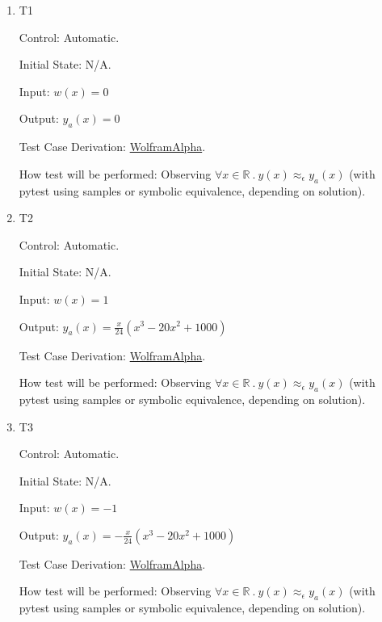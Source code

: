 \documentclass[12pt, titlepage]{article}
\begin{document}
\begin{enumerate}

    \item{T1\\}

    Control: Automatic.

    Initial State: N/A.

    Input: \(w(x) = 0\)

    Output: \(y_a(x) = 0\)

    Test Case Derivation: \href{https://www.wolframalpha.com/input?i=%5B%2F%2Fmath%3Asolve+y%27%27%27%27%3D0%2Cy%280%29%3D0%2Cy%2810%29%3D0%2Cy%27%27%280%29%3D0%2Cy%27%27%2810%29%3D0%2F%2F%5D}{WolframAlpha}.

    How test will be performed: Observing \(\forall x \in \mathbb{R}~.~y(x)
    \approx_{\epsilon} y_a(x)\) (with pytest using samples or symbolic
    equivalence, depending on solution).

    \item{T2\\}

    Control: Automatic.

    Initial State: N/A.

    Input: \(w(x) = 1\)

    Output: \(y_a(x) = \frac{x}{24} (x^3 - 20x^2 + 1000)\)

    Test Case Derivation: \href{https://www.wolframalpha.com/input?i=%5B%2F%2Fmath%3Asolve+y%27%27%27%27%3D1%2Cy%280%29%3D0%2Cy%2810%29%3D0%2Cy%27%27%280%29%3D0%2Cy%27%27%2810%29%3D0%2F%2F%5D}{WolframAlpha}.

    How test will be performed: Observing \(\forall x \in \mathbb{R}~.~y(x)
    \approx_{\epsilon} y_a(x)\) (with pytest using samples or symbolic
    equivalence, depending on solution).

    \item{T3\\}

    Control: Automatic.

    Initial State: N/A.

    Input: \(w(x) = -1\)

    Output: \(y_a(x) = - \frac{x}{24} (x^3 - 20x^2 + 1000)\)

    Test Case Derivation: \href{https://www.wolframalpha.com/input?i=%5B%2F%2Fmath%3Asolve+y%27%27%27%27%3D-1%2Cy%280%29%3D0%2Cy%2810%29%3D0%2Cy%27%27%280%29%3D0%2Cy%27%27%2810%29%3D0%2F%2F%5D}{WolframAlpha}.

    How test will be performed: Observing \(\forall x \in \mathbb{R}~.~y(x)
    \approx_{\epsilon} y_a(x)\) (with pytest using samples or symbolic
    equivalence, depending on solution).


\end{enumerate}
\end{document}
